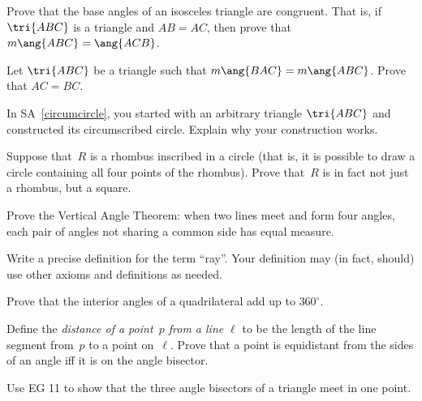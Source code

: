 \begin{EG}\label{ITT}
Prove that the base angles of an isosceles triangle are congruent.
That is, if $\tri{ABC}$ is a triangle and $AB=AC$,
then prove that $m\ang{ABC}=\ang{ACB}$.
\end{EG}

\begin{EG}\label{ITT-converse}
Let $\tri{ABC}$ be a triangle such that $m\ang{BAC}=m\ang{ABC}$.
Prove that $AC=BC$.
\end{EG}

\begin{EG} \label{circumcircle-explain}
In SA~\ref{circumcircle}, you started with an arbitrary triangle
$\tri{ABC}$ and constructed its circumscribed circle.
Explain why your construction works.
\end{EG}

\begin{EG} \label{inscribed-rhombus}
Suppose that~$R$ is a rhombus inscribed in a circle
(that is, it is possible to draw a circle containing all four
points of the rhombus).  Prove that~$R$ is in fact not just
a rhombus, but a square.
\end{EG}

\begin{EG} \label{VAT}
Prove the Vertical Angle Theorem: when two lines meet and form
four angles, each pair of angles not sharing a common side has
equal measure.
\end{EG}

\begin{EG}\label{ray}
Write a precise definition for the term ``ray''.  Your definition
may (in fact, should) use other axioms and definitions as needed.
\end{EG}

\begin{EG}
Prove that the interior angles of a quadrilateral add up to $360^\circ$.
\end{EG}

\begin{EG}
\label{point-from-line}
Define the \emph{distance of a point~$p$ from a line $\ell$} to be the length of the line segment from~$p$ to a point on~$\ell$.  Prove that a point is equidistant from the sides of an angle iff it is on the angle bisector.
\end{EG}

\begin{EG}
Use EG 11 to show that the three angle bisectors of a triangle meet in one point.
\end{EG}

